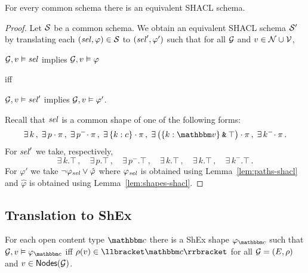 \begin{lemma}
\label{lem:schemas-shacl}
For every common schema there is an equivalent SHACL schema.  
\end{lemma}

\begin{proof} 
Let $\mathcal{S}$ be a common schema. We obtain an equivalent SHACL schema $\mathcal{S}'$ by translating each  $(\mathit{sel}, \varphi) \in \mathcal{S}$ to $(\mathit{sel}', \varphi')$ such that for all $\mathcal{G}$ and $v\in \mathcal{N}\cup\mathcal{V}$, 

\begin{center}
 $\mathcal{G}, v \vDash \mathit{sel}$ implies $\mathcal{G}, v \vDash \varphi$ 
 
 iff 
 
 $\mathcal{G}, v \vDash \mathit{sel}'$ implies $\mathcal{G}, v \vDash \varphi'$.
 \end{center}
 Recall that $\mathit{sel}$ is a common shape of one of the following forms:
\[ 
\exists\, k \,,\;
\exists\, p \cdot \pexpr\,, \;
\exists\, p^{-}\!\cdot \pexpr \,,\;
\exists\, \{k:c\}\cdot \pexpr \,, \;
\exists\, \big(\{k:\vtype\}\tAnd\top\big)\cdot \pexpr \,, \;
\exists\, k^{-}\!\cdot \pexpr\,.
\] 
For $\mathit{sel}'$ we take, respectively, 
\[ 
\exists\, k.\top \,,\quad
\exists\, p.\top\,, \quad 
\exists\, p^{-}.\top \,,\quad 
\exists\, k.\top\,, \quad 
\exists\, k.\top\,, \quad 
\exists\, k^{-}.\top\,.
\]
For $\varphi'$ we take $\lnot \varphi_{\mathit{sel}} \lor \hat\varphi$ where $\varphi_{\mathit{sel}}$ is obtained using Lemma~\ref{lem:paths-shacl}
 and $\hat\varphi$ is obtained using Lemma~\ref{lem:shapes-shacl}. 
 \end{proof}

\subsection{Translation to ShEx}


\begin{lemma}
\label{lem:contents-shex}
For each open content type $\ntype$ there is a ShEx shape $\varphi_{\ntype}$ such that  $\graph, v\models \varphi_{\ntype}$ iff $\rho(v) \in \sem{\ntype}$ for all  $\mathcal{G}=(E,\rho)$ and $v\in\mathsf{Nodes}(\mathcal{G})$.
\end{lemma}

